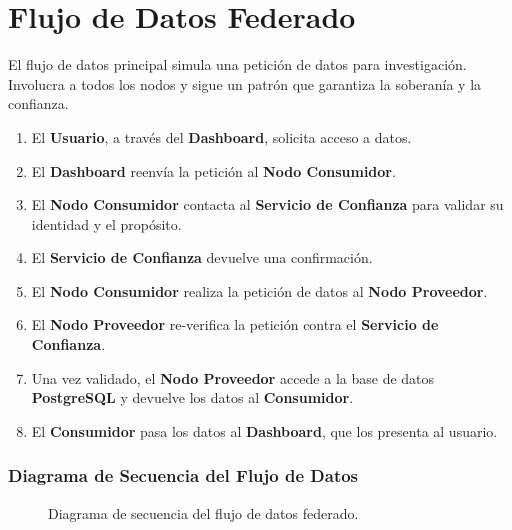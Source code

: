\section{Flujo de Datos Federado}

El flujo de datos principal simula una petición de datos para investigación. Involucra a todos los nodos y sigue un patrón que garantiza la soberanía y la confianza.

\begin{enumerate}
    \item El \textbf{Usuario}, a través del \textbf{Dashboard}, solicita acceso a datos.
    \item El \textbf{Dashboard} reenvía la petición al \textbf{Nodo Consumidor}.
    \item El \textbf{Nodo Consumidor} contacta al \textbf{Servicio de Confianza} para validar su identidad y el propósito.
    \item El \textbf{Servicio de Confianza} devuelve una confirmación.
    \item El \textbf{Nodo Consumidor} realiza la petición de datos al \textbf{Nodo Proveedor}.
    \item El \textbf{Nodo Proveedor} re-verifica la petición contra el \textbf{Servicio de Confianza}.
    \item Una vez validado, el \textbf{Nodo Proveedor} accede a la base de datos \textbf{PostgreSQL} y devuelve los datos al \textbf{Consumidor}.
    \item El \textbf{Consumidor} pasa los datos al \textbf{Dashboard}, que los presenta al usuario.
\end{enumerate}

\subsubsection*{Diagrama de Secuencia del Flujo de Datos}
\begin{figure}[H]
    \centering
    \caption{Diagrama de secuencia del flujo de datos federado.}
    \label{fig:data_flow}
\end{figure}

